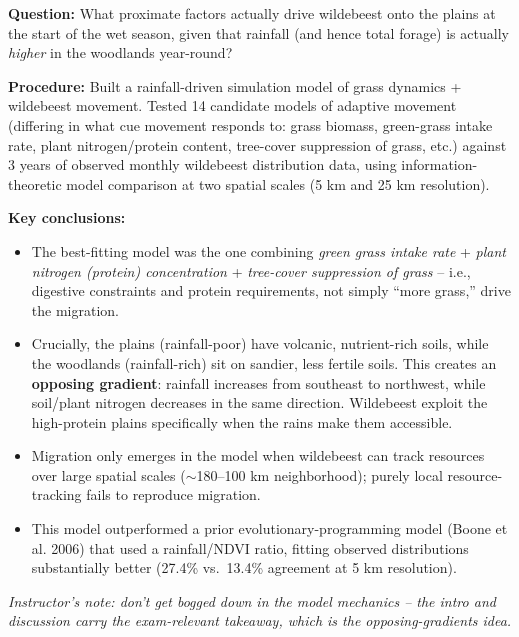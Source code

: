 \documentclass[11pt,a4paper]{article}
\begin{document}
\begin{papbox}[title={Paper Summary: Holdo, Holt \& Fryxell (2009), \textit{Am. Nat.} -- ``Opposing Rainfall and Plant Nutritional Gradients Best Explain the Wildebeest Migration in the Serengeti''}]
\textbf{Question:} What proximate factors actually drive wildebeest onto the plains at the start of the wet season, given that rainfall (and hence total forage) is actually \emph{higher} in the woodlands year-round?

\textbf{Procedure:} Built a rainfall-driven simulation model of grass dynamics + wildebeest movement. Tested 14 candidate models of adaptive movement (differing in what cue movement responds to: grass biomass, green-grass intake rate, plant nitrogen/protein content, tree-cover suppression of grass, etc.) against 3 years of observed monthly wildebeest distribution data, using information-theoretic model comparison at two spatial scales (5 km and 25 km resolution).

\textbf{Key conclusions:}
\begin{itemize}[leftmargin=1.3em,nosep]
\item The best-fitting model was the one combining \emph{green grass intake rate} + \emph{plant nitrogen (protein) concentration} + \emph{tree-cover suppression of grass} -- i.e., digestive constraints and protein requirements, not simply ``more grass,'' drive the migration.
\item Crucially, the plains (rainfall-poor) have volcanic, nutrient-rich soils, while the woodlands (rainfall-rich) sit on sandier, less fertile soils. This creates an \textbf{opposing gradient}: rainfall increases from southeast to northwest, while soil/plant nitrogen decreases in the same direction. Wildebeest exploit the high-protein plains specifically when the rains make them accessible.
\item Migration only emerges in the model when wildebeest can track resources over large spatial scales ($\sim$180--100 km neighborhood); purely local resource-tracking fails to reproduce migration.
\item This model outperformed a prior evolutionary-programming model (Boone et al. 2006) that used a rainfall/NDVI ratio, fitting observed distributions substantially better (27.4\% vs.\ 13.4\% agreement at 5 km resolution).
\end{itemize}
\textit{Instructor's note: don't get bogged down in the model mechanics -- the intro and discussion carry the exam-relevant takeaway, which is the opposing-gradients idea.}
\end{papbox}
\end{document}
